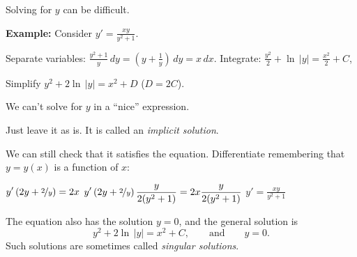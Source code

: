 \documentclass[10pt,aspectratio=169]{beamer}
\begin{document}
\begin{frame}
Solving for $y$ can be difficult.

\medskip
\pause

\textbf{Example:}
Consider \quad
$\displaystyle
y' = \frac{xy}{y^2+1}$.

\medskip
\pause

Separate variables:
\quad
$\displaystyle
\frac{y^2+1}{y}\,dy = \left(y+\frac{1}{y}\right)\,dy = x\,dx$.
\qquad
\pause
Integrate:
\quad
$\displaystyle
\frac{y^2}{2} + \ln \, \lvert y \rvert = \frac{x^2}{2} + C$,

\medskip
\pause

Simplify
\quad
$\displaystyle
y^2 + 2 \ln \, \lvert y\rvert = x^2 + D$
\quad ($D=2C$).

\medskip
\pause

We can't solve for $y$ in a ``nice'' expression.

\medskip
\pause

Just leave it as is.
\pause
It is called an \emph{implicit solution}.

\medskip
\pause

We can still check that it satisfies the equation.
\pause
Differentiate remembering that $y=y(x)$ is a function of $x$:

\medskip
\pause

\quad
$\displaystyle
y'\left(2y + \nicefrac{2}{y}\right) = 2x$
\pause\wthus
$\displaystyle
y'\left(2y + \nicefrac{2}{y}\right)\frac{y}{2(y^2+1)} = 2x\frac{y}{2(y^2+1)}$
\pause\wthus
$\displaystyle
y' = \frac{xy}{y^2+1}$
\quad
{\Large\checkmark}

\medskip
\pause

The equation also has the solution $y=0$, and the general solution is
\begin{equation*}
y^2 + 2 \ln \, \lvert y \rvert = x^2 + C, \qquad \text{and} \qquad y=0.
\end{equation*}
\pause
Such solutions are sometimes called \emph{singular solutions}.


\end{frame}
\end{document}
